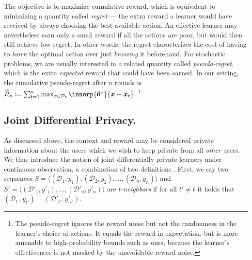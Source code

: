 \documentclass{article}
\newcommand{\os}[1]{\textcolor{red}{Or's comment:~\textbf{#1}}}
\renewcommand{\vec}[1]{\bm{#1}}
\newcommand{\defeq}{\coloneq}
\newcommand{\D}{\mathcal{D}}
\begin{document}
The objective is to maximize cumulative reward, which is equivalent to
minimizing a quantity called \emph{regret} --- the extra reward a
learner would have received by always choosing the best available
action.  An effective learner may nevertheless earn only a small
reward if all the actions are poor, but would then still achieve low
regret.  In other words, the regret characterizes the cost of having
to \emph{learn} the optimal action over just \emph{knowing} it beforehand.
For stochastic problems, we are usually interested in a related
quantity called \emph{pseudo-regret}, which is the extra
\emph{expected} reward that could have been earned.  In our setting,
the cumulative pseudo-regret after $n$ rounds is
$\widehat{R}_n \defeq
\sum_{t=1}^n\max_{x\in\D_t}\innerp{\vec\theta^*}{\vec x - \vec x_t}$.%
\footnote{The pseudo-regret ignores the reward noise but not the
  randomness in the learner's choice of actions.  It equals the reward
  in expectation, but is more amenable to high-probability bounds such
  as ours, because the learner's effectiveness is not masked by the
  unavoidable reward noise.}


\subsection{Joint Differential Privacy.}%
\label{sec:joint-dp}

As discussed above, the context and reward may be considered private
information about the users which we wish to keep private from all
\emph{other} users. We thus introduce the notion of joint
differentially private learners under continuous observation, a
combination of two definitions \citep[given
in][]{KearnsMechanismDesign2014,DworkContinualObservation2010}. First,
we say two sequences
$S = \langle (\mathcal{D}_1, y_1), (\mathcal{D}_2, y_2), ...,
(\mathcal{D}_n, y_n) \rangle$ and
$S' = \langle (\mathcal{D}'_1, y'_1), ..., (\mathcal{D}'_n, y'_n)
\rangle$ are \emph{$t$-neighbors} if for all $t'\neq t$ it holds that
$(\mathcal{D}_{t'},y_{t'}) = (\mathcal{D}'_{t'}, y'_{t'})$.
\end{document}
